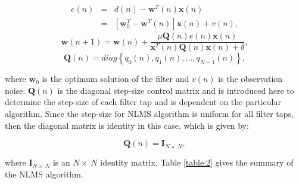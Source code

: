 \vspace{-1.5cm}
\begin{eqnarray}
\nonumber
e(n)&=&d(n)-\textbf{w}^T(n)\textbf{x}(n)\\
&=&[\textbf{w}_0^{T}-\textbf{w}^{T}(n)] \textbf{x}(n)+v(n), \label{eq8b}
\end{eqnarray}
\vspace{-0.6cm}
\begin{equation}
\textbf{w}(n+1)=\textbf{w}(n)+\frac{\mu \textbf{Q}(n)e(n)\textbf{x}(n)}{\textbf{x}^{T}(n)\textbf{Q}(n)\textbf{x}(n)+\delta}, \label{eq9b}
\end{equation}
\vspace{-1cm}
\begin{equation}
  \textbf{Q}(n)=diag\left\{q_0(n),q_1(n),\ldots,q_{N-1}(n)\right\}, \label{eq10b}
\end{equation}

\noindent where $\textbf{w}_0$ is the optimum solution of the filter and $v(n)$ is the observation noise. $\textbf{Q}(n)$ is the diagonal step-size control matrix and is introduced here to determine the step-size of each filter tap and is dependent on the particular algorithm. Since the step-size for NLMS algorithm is uniform for all filter taps, then the diagonal matrix is identity in this case, which is given by:

\vspace{-1.5cm}
\begin{equation}
  \textbf{Q}(n)=\textbf{I}_{N\times\ N}, \label{eq11b}
\end{equation}

\vspace{-0.6cm}
\noindent where $\textbf{I}_{N\times\ N}$ is an $N\times\ N$ identity matrix. Table \ref{table:2} gives the summary of the NLMS algorithm.


